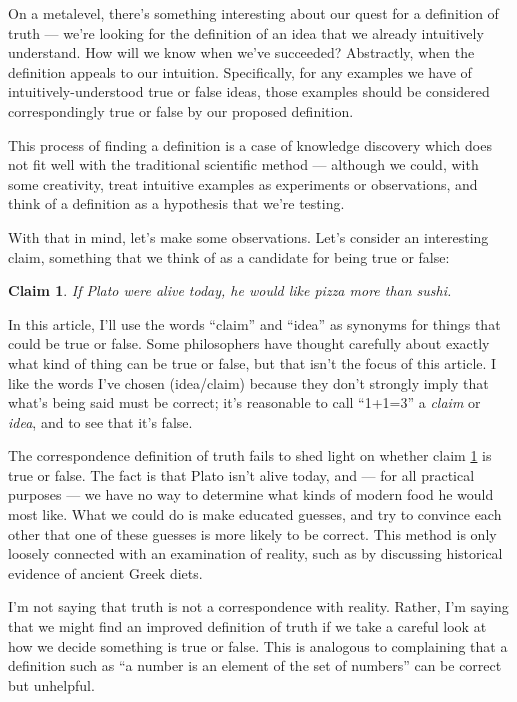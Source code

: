 \documentclass[11pt, oneside]{article}   	%
\newtheorem{claim}{Claim}
\begin{document}
On a metalevel, there's something interesting about our quest for a definition
of truth --- we're
looking for the definition of an idea that we already intuitively understand.
How will we know when we've succeeded? Abstractly, when the definition
appeals to our intuition.
Specifically, for any examples we have of intuitively-understood true or false
ideas, those examples should be considered correspondingly true or false by our
proposed definition.

This process of finding a definition is a case of
knowledge discovery which does not fit well with the traditional scientific
method --- although we could, with some creativity, treat
intuitive examples as
experiments or observations, and think of a definition as a hypothesis that
we're testing.

With that in mind, let's make some observations. Let's consider an
interesting claim, something that we think of as a candidate for
being true or false:
\begin{claim}\label{c1}
    If Plato were alive today, he would like pizza more than sushi.
\end{claim}
In this article, I'll use the words ``claim'' and ``idea'' as
synonyms for things that could be true or false. Some philosophers have thought
carefully about exactly what kind of thing can be true or false, but that isn't
the focus of this article.
I like the words I've chosen (idea/claim) because they don't
strongly imply that what's being said must be correct; it's reasonable to
call ``1+1=3'' a {\em claim} or {\em idea}, and to see that it's false.

The correspondence definition of truth fails to shed light
on whether claim \ref{c1} is true or false.
The fact is that Plato isn't alive today, and --- for all practical purposes
--- we have no way to determine what kinds of modern food he would most like.
What we could do is make educated guesses, and try to convince each other
that one of these guesses is more likely to be correct.
This method is only loosely connected with an examination of reality, such as by
discussing historical evidence of ancient Greek diets.

I'm not saying that truth is not a correspondence
with reality.
Rather, I'm saying that we might find an improved definition of truth if we take
a careful look at how we decide something is true or false.
This is analogous to complaining that a definition such as ``a number is an
element of the set of numbers'' can be correct but unhelpful.
\end{document}
